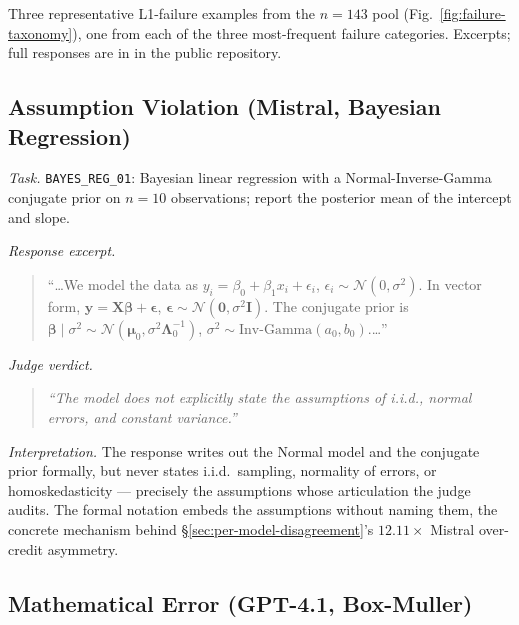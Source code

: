 
\label{appendix:case-studies}

Three representative L1-failure examples from the $n=143$ pool
(Fig.~\ref{fig:failure-taxonomy}), one from each of the three
most-frequent failure categories. Excerpts; full responses are in
in the public repository.

\subsection{Assumption Violation (Mistral, Bayesian Regression)}
\label{appendix:case-b1}

\textit{Task.} \texttt{BAYES\_REG\_01}: Bayesian linear regression
with a Normal-Inverse-Gamma conjugate prior on $n=10$ observations;
report the posterior mean of the intercept and slope.

\textit{Response excerpt.}
\begin{quote}\small
``\dots We model the data as $y_i = \beta_0 + \beta_1 x_i + \epsilon_i$,
$\epsilon_i \sim \mathcal{N}(0, \sigma^2)$. In vector form,
$\mathbf{y} = \mathbf{X}\boldsymbol{\beta} + \boldsymbol{\epsilon}$,
$\boldsymbol{\epsilon} \sim \mathcal{N}(\mathbf{0}, \sigma^2 \mathbf{I})$.
The conjugate prior is $\boldsymbol{\beta} \mid \sigma^2 \sim
\mathcal{N}(\boldsymbol{\mu}_0, \sigma^2 \boldsymbol{\Lambda}_0^{-1})$,
$\sigma^2 \sim \text{Inv-Gamma}(a_0, b_0)$.\dots''
\end{quote}

\textit{Judge verdict.}
\begin{quote}\small\textit{
``The model does not explicitly state the assumptions of i.i.d.,
normal errors, and constant variance.''
}\end{quote}

\textit{Interpretation.} The response writes out the Normal model
and the conjugate prior formally, but never states i.i.d.\ sampling,
normality of errors, or homoskedasticity --- precisely the
assumptions whose articulation the judge audits. The formal
notation embeds the assumptions without naming them, the concrete
mechanism behind \S\ref{sec:per-model-disagreement}'s $12.11\times$
Mistral over-credit asymmetry.

\subsection{Mathematical Error (GPT-4.1, Box-Muller)}
\label{appendix:case-b2}

